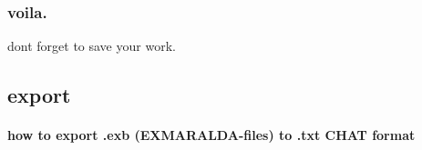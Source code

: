 \documentclass[
  12pt,
]{article}
\begin{document}
\hypertarget{voila.}{%
\subsubsection{voila.}\label{voila.}}

dont forget to save your work.

\hypertarget{export}{%
\subsection{export}\label{export}}

\hypertarget{how-to-export-.exb-exmaralda-files-to-.txt-chat-format}{%
\paragraph{how to export .exb (EXMARALDA-files) to .txt CHAT
format}\label{how-to-export-.exb-exmaralda-files-to-.txt-chat-format}}
\end{document}
